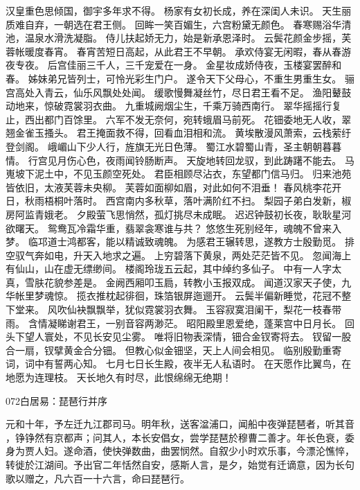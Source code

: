 汉皇重色思倾国，御宇多年求不得。
杨家有女初长成，养在深闺人未识。
天生丽质难自弃，一朝选在君王侧。
回眸一笑百媚生，六宫粉黛无颜色。
春寒赐浴华清池，温泉水滑洗凝脂。
侍儿扶起娇无力，始是新承恩泽时。
云鬓花颜金步摇，芙蓉帐暖度春宵。
春宵苦短日高起，从此君王不早朝。
承欢侍宴无闲暇，春从春游夜专夜。
后宫佳丽三千人，三千宠爱在一身。
金星妆成娇侍夜，玉楼宴罢醉和春。
姊妹弟兄皆列士，可怜光彩生门户。
遂令天下父母心，不重生男重生女。
骊宫高处入青云，仙乐风飘处处闻。
缓歌慢舞凝丝竹，尽日君王看不足。
渔阳鼙鼓动地来，惊破霓裳羽衣曲。
九重城阙烟尘生，千乘万骑西南行。
翠华摇摇行复止，西出都门百馀里。
六军不发无奈何，宛转蛾眉马前死。
花钿委地无人收，翠翘金雀玉搔头。
君王掩面救不得，回看血泪相和流。
黄埃散漫风萧索，云栈萦纡登剑阁。
峨嵋山下少人行，旌旗无光日色薄。
蜀江水碧蜀山青，圣主朝朝暮暮情。
行宫见月伤心色，夜雨闻铃肠断声。
天旋地转回龙驭，到此踌躇不能去。
马嵬坡下泥土中，不见玉颜空死处。
君臣相顾尽沾衣，东望都门信马归。
归来池苑皆依旧，太液芙蓉未央柳。
芙蓉如面柳如眉，对此如何不泪垂！
春风桃李花开日，秋雨梧桐叶落时。
西宫南内多秋草，落叶满阶红不扫。
梨园子弟白发新，椒房阿监青娥老。
夕殿萤飞思悄然，孤灯挑尽未成眠。
迟迟钟鼓初长夜，耿耿星河欲曙天。
鸳鸯瓦冷霜华重，翡翠衾寒谁与共？
悠悠生死别经年，魂魄不曾来入梦。
临邛道士鸿都客，能以精诚致魂魄。
为感君王辗转思，遂教方士殷勤觅。
排空驭气奔如电，升天入地求之遍。
上穷碧落下黄泉，两处茫茫皆不见。
忽闻海上有仙山，山在虚无缥缈间。
楼阁玲珑五云起，其中绰约多仙子。
中有一人字太真，雪肤花貌参差是。
金阙西厢叩玉扃，转教小玉报双成。
闻道汉家天子使，九华帐里梦魂惊。
揽衣推枕起徘徊，珠箔银屏迤逦开。
云鬓半偏新睡觉，花冠不整下堂来。
风吹仙袂飘飘举，犹似霓裳羽衣舞。
玉容寂寞泪阑干，梨花一枝春带雨。
含情凝睇谢君王，一别音容两渺茫。
昭阳殿里恩爱绝，蓬莱宫中日月长。
回头下望人寰处，不见长安见尘雾。
唯将旧物表深情，钿合金钗寄将去。
钗留一股合一扇，钗擘黄金合分钿。
但教心似金钿坚，天上人间会相见。
临别殷勤重寄词，词中有誓两心知。
七月七日长生殿，夜半无人私语时。
在天愿作比翼鸟，在地愿为连理枝。
天长地久有时尽，此恨绵绵无绝期！

072白居易：琵琶行并序

元和十年，予左迁九江郡司马。明年秋，送客湓浦口，闻船中夜弹琵琶者，听其音
，铮铮然有京都声；问其人，本长安倡女，尝学琵琶於穆曹二善才。年长色衰，委
身为贾人妇。遂命酒，使快弹数曲，曲罢悯然。自叙少小时欢乐事，今漂沦憔悴，
转徙於江湖间。予出官二年恬然自安，感斯人言，是夕，始觉有迁谪意，因为长句
歌以赠之，凡六百一十六言，命曰琵琶行。

